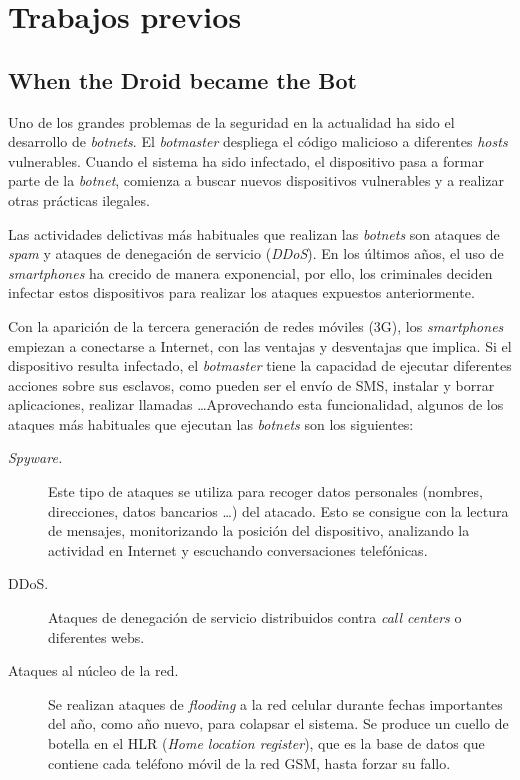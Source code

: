 \documentclass[a4paper,11pt]{report}
\begin{document}
\chapter{Trabajos previos} \label{tPrevios}

\section{When the Droid became the Bot}

Uno de los grandes problemas de la seguridad en la actualidad ha sido el desarrollo de \emph{botnets}. El \emph{botmaster} despliega el código malicioso a diferentes \emph{hosts} vulnerables. Cuando el sistema ha sido infectado, el dispositivo pasa a formar parte de la \emph{botnet}, comienza a buscar nuevos dispositivos vulnerables y a realizar otras prácticas ilegales.

Las actividades delictivas más habituales que realizan las \emph{botnets} son ataques de \emph{spam} y ataques de denegación de servicio (\emph{DDoS}). En los últimos años, el uso de \emph{smartphones} ha crecido de manera exponencial, por ello, los criminales deciden infectar estos dispositivos para realizar los ataques expuestos anteriormente.

Con la aparición de la tercera generación de redes móviles (3G), los \emph{smartphones} empiezan a conectarse a Internet, con las ventajas y desventajas que implica. Si el dispositivo resulta infectado, el \emph{botmaster} tiene la capacidad de ejecutar diferentes acciones sobre sus esclavos, como pueden ser el envío de SMS, instalar y borrar aplicaciones, realizar llamadas \ldots Aprovechando esta funcionalidad, algunos de los ataques más habituales que ejecutan las \emph{botnets} son los siguientes:

\begin{description}
\item[\emph{Spyware.}] Este tipo de ataques se utiliza para recoger datos personales (nombres, direcciones, datos bancarios \ldots) del atacado. Esto se consigue con la lectura de mensajes, monitorizando la posición del dispositivo, analizando la actividad en Internet y escuchando conversaciones telefónicas.
\item[DDoS.] Ataques de denegación de servicio distribuidos contra \emph{call centers} o diferentes webs.
\item[Ataques al núcleo de la red.] Se realizan ataques de \emph{flooding} a la red celular durante fechas importantes del año, como año nuevo, para colapsar el sistema. Se produce un cuello de botella en el HLR (\emph{Home location register}), que es la base de datos que contiene cada teléfono móvil de la red GSM, hasta forzar su fallo.
\end{description}
\end{document}
